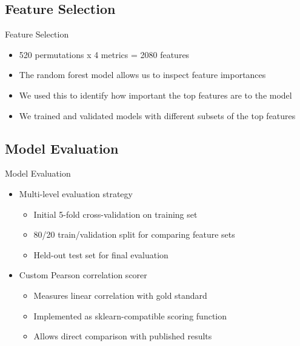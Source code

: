 \documentclass{beamer}
\begin{document}
\subsection{Feature Selection}
\begin{frame}{Feature Selection}
    \begin{itemize}
        \item 520 permutations x 4 metrics = 2080 features
        \item The random forest model allows us to inspect feature importances
        \item We used this to identify how important the top features are to the model
        \item We trained and validated models with different subsets of the top features
    \end{itemize}
\end{frame}

\subsection{Model Evaluation}
\begin{frame}{Model Evaluation}
    \begin{itemize}
        \item Multi-level evaluation strategy
        \begin{itemize}
            \item Initial 5-fold cross-validation on training set
            \item 80/20 train/validation split for comparing feature sets
            \item Held-out test set for final evaluation
        \end{itemize}
        \item Custom Pearson correlation scorer
        \begin{itemize}
            \item Measures linear correlation with gold standard
            \item Implemented as sklearn-compatible scoring function
            \item Allows direct comparison with published results
        \end{itemize}
    \end{itemize}
\end{frame}

\end{document}
